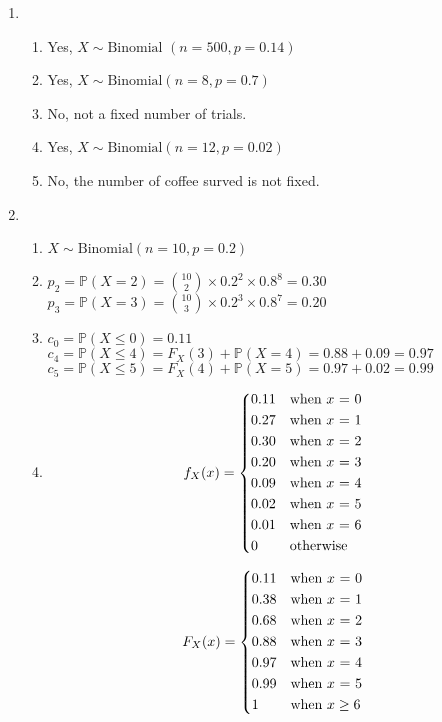 \documentclass[12pt, oneside, a4paper]{article}
\begin{document}
	\begin{enumerate}
		\item \begin{enumerate}[label = (\alph*)]
			\item Yes, $X \sim \text{Binomial }(n = 500, p = 0.14)$
			\item Yes, $X \sim \text{Binomial}(n = 8, p = 0.7)$
			\item No, not a fixed number of trials.
			\item Yes, $X \sim \text{Binomial}(n = 12, p = 0.02)$
			\item No, the number of coffee surved is not fixed.
		\end{enumerate}
		
		\item \begin{enumerate}[label = (\alph*)]
			\item $X \sim \text{Binomial}(n = 10, p = 0.2)$
			\item 		
			$p_2 = \mathbb{P}(X = 2) = \binom{10}{2} \times 0.2^2 \times 0.8 ^8 = 0.30$ \\
			$p_3 = \mathbb{P}(X = 3) = \binom{10}{3} \times 0.2^3 \times 0.8 ^7 = 0.20$
			\item $c_0 = \mathbb{P}(X \leq 0) = 0.11$\\
			$c_4 = \mathbb{P}(X \leq 4) = F_X(3) + \mathbb{P}(X=4) = 0.88 + 0.09 = 0.97$\\
			$c_5 = \mathbb{P}(X \leq 5) = F_X(4) + \mathbb{P}(X=5) = 0.97 + 0.02 = 0.99$
			\item 
			\[ f_X(x) = 
			\begin{dcases*}
			0.11 & when $x$ = 0 \\
			0.27 & when $x$ = 1\\
			0.30 & when $x$ = 2 \\
			0.20 & when $x$ = 3 \\
			0.09 & when $x$ = 4 \\
			0.02 & when $x$ = 5 \\
			0.01 & when $x$ = 6 \\
			0 & otherwise
			\end{dcases*}\]
			
			\[
			F_X(x) = \begin{dcases*}
			0.11 & when $x$ = 0\\
			0.38 & when $x$ = 1 \\
			0.68 & when $x$ = 2 \\
			0.88 & when $x$ = 3 \\
			0.97 & when $x$ = 4 \\
			0.99 & when $x$ = 5 \\
			1 & when $x \geq 6$
			\end{dcases*}
			\]
			

\end{enumerate}
\end{enumerate}
\end{document}
